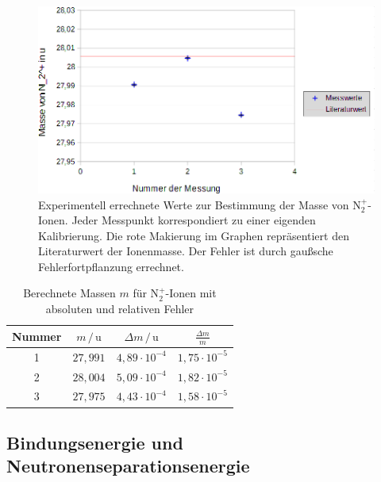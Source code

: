 \documentclass[numbers=noenddot,a4paper,notitlepage,twoside,BCOR15mm]{scrartcl}
\begin{document}
				\begin{figure}[!h]
					\centering
					\includegraphics[width = 0.7\columnwidth]{pics/Masse}
					\caption{Experimentell errechnete Werte zur Bestimmung der Masse von N$_2^+$-Ionen. Jeder Messpunkt korrespondiert zu einer eigenden Kalibrierung. Die rote Makierung im Graphen repräsentiert den Literaturwert der Ionenmasse. Der Fehler ist durch gaußsche Fehlerfortpflanzung errechnet.}
					\label{abb:masse}
				\end{figure}
				
		
						\begin{table}[h]
					\centering
					\caption{Berechnete Massen $m$ für N$^+_2$-Ionen mit absoluten und relativen Fehler}
					\begin{tabular}{c|c c c} 
					
						Nummer & $m\,/\,\mathrm{u}$ & $\Delta m\,/\,\mathrm{u}$ & $\frac{\Delta m}{m}$ \\ \hline
						1 & $27,991$ & $4,89\cdot 10^{-4}$ & $1,75\cdot 10^{-5}$ \\
						2 & $28,004$ & $5,09\cdot 10^{-4}$ & $1,82\cdot 10^{-5}$ \\
						3 & $27,975$ & $4,43\cdot 10^{-4}$ & $1,58\cdot 10^{-5}$ 
					\end{tabular}
					\label{tab:masse}
				\end{table}
				\newpage

		\subsection{Bindungsenergie und Neutronenseparationsenergie}
		
\end{document}

